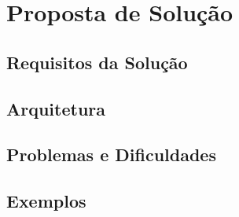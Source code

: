 \chapter{Proposta de Solução}
\label{cap:proposta}

\section{Requisitos da Solução}
\section{Arquitetura}
\section{Problemas e Dificuldades}
\section{Exemplos}
